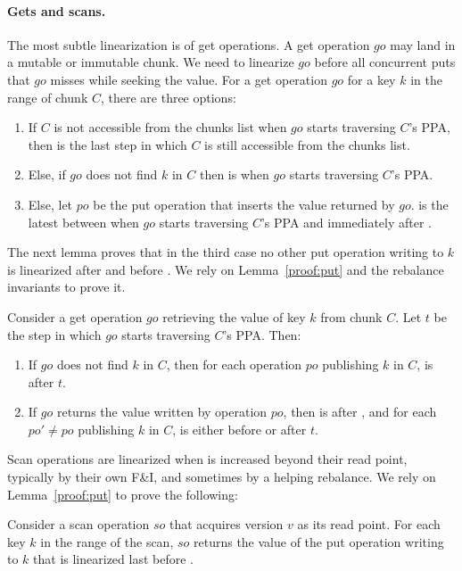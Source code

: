 \paragraph{Gets and scans.}

The most subtle linearization is of get operations.
A get operation $go$ may land in a mutable or immutable chunk. 
We need to linearize $go$ before all concurrent puts that $go$ misses while seeking the value.
For a get operation $go$ for a key $k$ in the range of chunk $C$, there are three options:
\begin{enumerate}
\setlength{\itemsep}{0pt}
\setlength{\parskip}{0pt}
\item If $C$ is not accessible from the chunks list when $go$ starts traversing $C$'s PPA, then  is the last step in which $C$ is still accessible from the chunks list.
\item Else, if $go$ does not find $k$ in $C$ then  is when $go$ starts traversing $C$'s PPA.
\item Else, let $po$ be the put operation that inserts the value returned by $go$.  is the latest between when $go$ starts traversing $C$'s {PPA} and immediately after .
\end{enumerate}

The next lemma proves that in the third case no other put operation writing to $k$ is linearized after  and before .
We rely on %
Lemma~\ref{proof:put} and the rebalance invariants to prove it.

\begin{lemma}
\label{proof:get}
Consider a get operation $go$ retrieving the value of key $k$ from chunk $C$. Let $t$ be the step in which $go$ starts traversing $C$'s {PPA}. Then:
\begin{enumerate}
\setlength{\itemsep}{0pt}
\setlength{\parskip}{0pt}
\item \label{proof:get:lp1} If $go$ does not find $k$ in $C$, then for each operation $po$ publishing $k$ in $C$,  is after $t$.
\item \label{proof:get:lp2} If $go$ returns the value written by operation $po$, then  is after , and for each  $po' \neq po$ publishing $k$ in $C$,  is either before  or after $t$.
\end{enumerate}
\end{lemma}

Scan operations are linearized when  is increased beyond their read point, typically by their own F\&I, and sometimes by a helping rebalance. 
We rely on %
Lemma~\ref{proof:put} to prove the following:
\begin{lemma}
\label{proof:scan}
Consider a scan operation $so$ that acquires version $v$ as its read point. For each key $k$ in the range of the scan, $so$ returns the value of the put operation writing to $k$ that is linearized last before .
\end{lemma}

